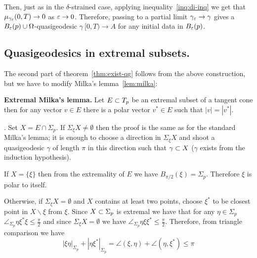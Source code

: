 \documentclass{article}
\begin{document}
Then, just as in the $\delta$-strained case, applying
inequality~\ref{inq:di-inq} we get that $\mu_{\gamma_{\varepsilon}}(0,T)\to0$ as
$\varepsilon\to 0$. 
Therefore, passing to a partial limit $\gamma_\varepsilon\to\gamma$ gives a
$B_\varepsilon(p)\cup\Omega$-quasigeodesic $\gamma\:[0,T)\to A$ for any initial data in
$B_\varepsilon(p)$.
\qeds




\subsection{Quasigeodesics in extremal subsets.}\label{qg-extrim}

The second part of theorem~\ref{thm:exist-qg} follows from the above construction, but we have to
modify Milka's lemma~\ref{lem:milka}:

\begin{thm}{\bf Extremal Milka's lemma.} Let $E\subset T_p$ be an extremal subset of a tangent cone then for any vector $v\in E$ there is a polar vector $v^*\in E$
such that $|v|=|v^*|$.
\end{thm}

\Proof. Set $X=E\cap \Sigma_p$. If $\Sigma_\xi X\not=\emptyset$ then the proof is the
same as for the standard Milka's lemma; it is enough to choose a direction in
$\Sigma_\xi X$ and shoot a quasigeodesic $\gamma$ of length $\pi$ in this direction such that $\gamma\subset X$ ($\gamma$ exists from the induction hypothesis). 

If $X=\{\xi\}$ then from the extremality of $E$ we have $B_{\pi/2}(\xi)=\Sigma_p$. Therefore $\xi$ is polar to itself.

Otherwise, if $\Sigma_\xi X=\emptyset$ and $X$ contains at least two points, choose $\xi^*$ to be closest point in $X\backslash\xi$ from $\xi$. 
Since $X\subset \Sigma_p$ is extremal we have that for any $\eta\in \Sigma_p$ $\angle_{\Sigma_p}\eta\xi^*\xi\le\tfrac\pi2$ and since $\Sigma_\xi X=\emptyset$ we have $\angle_{\Sigma_p}\eta\xi\xi^*\le\tfrac\pi2$.
Therefore, from triangle comparison we have
$$|\xi\eta|_{\Sigma_p}+|\eta\xi^*|_{\Sigma_p}
=
\angle(\xi,\eta)+\angle(\eta,\xi^*)\le\pi$$
\qedsf
\end{document}
